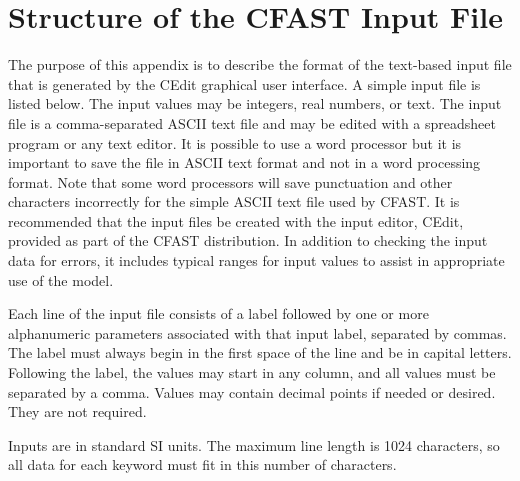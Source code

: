 \chapter{Structure of the CFAST Input File} \label{sec:CFAST_Keywords}



The purpose of this appendix is to describe the format of the text-based input file that is generated by the CEdit graphical user interface. A simple input file is listed below. The input values may be integers, real numbers, or text. The input file is a comma-separated ASCII text file and may be edited with a spreadsheet program or any text editor. It is possible to use a word processor but it is important to save the file in ASCII text format and not in a word processing format. Note that some word processors will save punctuation and other characters incorrectly for the simple ASCII text file used by CFAST. It is recommended that the input files be created with the input editor, CEdit, provided as part of the CFAST distribution.  In addition to checking the input data for errors, it includes typical ranges for input values to assist in appropriate use of the model.

Each line of the input file consists of a label followed by one or more alphanumeric parameters associated with that input label, separated by commas.  The label must always begin in the first space of the line and be in capital letters.  Following the label, the values may start in any column, and all values must be separated by a comma.  Values may contain decimal points if needed or desired.  They are not required.

Inputs are in standard SI units.  The maximum line length is 1024 characters, so all data for each keyword must fit in this number of characters.

